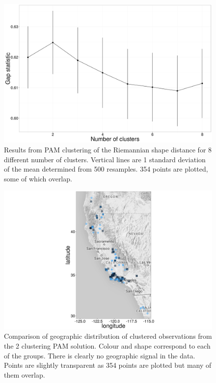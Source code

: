 \documentclass[12pt,letterpaper]{article}
\begin{document}
\begin{figure}[h]
  \centering
  \includegraphics[height = 0.5\textheight, width = \textwidth, keepaspectratio = true]{figure/gap_res}
  \caption{Results from PAM clustering of the Riemannian shape distance for 8 different number of clusters. Vertical lines are 1 standard deviation of the mean determined from 500 resamples. 354 points are plotted, some of which overlap.}
  \label{fig:gap}
\end{figure}

\begin{figure}[h]
  \centering
  \includegraphics[height = 0.5\textheight, width = \textwidth, keepaspectratio = true]{figure/gap_map}
  \caption{Comparison of geographic distribution of clustered observations from the 2 clustering PAM solution. Colour and shape correspond to each of the groups. There is clearly no geographic signal in the data. Points are slightly transparent as 354 points are plotted but many of them overlap.}
  \label{fig:gap_map}
\end{figure}
\end{document}
